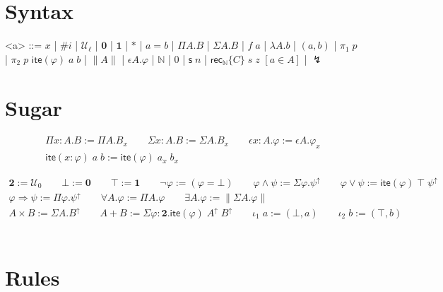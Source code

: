 \documentclass[acmsmall,screen,review]{acmart}
\newcommand{\mc}[1]{\ensuremath{\mathcal{#1}}}
\newcommand{\mb}[1]{\ensuremath{\mathbf{#1}}}
\newcommand{\ms}[1]{\ensuremath{\mathsf{#1}}}
\newcommand{\nats}{\mathbb{N}}
\newcommand{\dite}[3]{\ms{ite}(#1)\;#2\;#3}
\newcommand{\natrec}[3]{\ms{rec}_\nats\{#1\}\;#2\;#3}
\newcommand{\mhasty}[2]{[#1 \in #2]}
\newcommand{\invalidtm}[0]{\lightning}
\newcommand{\wkz}[1]{#1^\uparrow}
\newcommand{\clv}[2]{#1_{#2}}
\begin{document}
\section{Syntax}

\begin{grammar}
    <a> ::= \(x\) \;|\; \(\#i\) \;|\; \(\mc{U}_\ell\) \;|\; \(\mb{0}\) \;|\; \(\mb{1}\) \;|\; \(*\)
        \;|\; \(a = b\)
        \;|\; \(\Pi A . B\) \;|\; \(\Sigma A . B\) 
        \;|\; \(f\;a\) \;|\; \(\lambda A . b\)
        \;|\; \((a, b)\) \;|\; \(\pi_1\;p\) \;|\; \(\pi_2\;p\)
        \alt \(\dite{\varphi}{a}{b}\) \;|\; \(\|A\|\) \;|\; \(\epsilon A . \varphi\)
        \;|\; \(\nats\) \;|\; \(0\) \;|\; \(\ms{s}\;n\) \;|\; \(\natrec{C}{s}{z}\)
        \alt \(\mhasty{a}{A}\) \;|\; \(\invalidtm\)
\end{grammar}

\section{Sugar}

\begin{gather*}
    \Pi x : A . B := \Pi A . \clv{B}{x} \qquad
    \Sigma x : A . B := \Sigma A . \clv{B}{x} \qquad
    \epsilon x : A . \varphi := \epsilon A . \clv{\varphi}{x} \\
    \dite{x : \varphi}{a}{b} := \dite{\varphi}{\clv{a}{x}}{\clv{b}{x}}
\end{gather*}

\begin{gather*}
    \mb{2} := \mc{U}_0 \qquad
    \bot := \mb{0} \qquad
    \top := \mb{1} \qquad
    \lnot \varphi := (\varphi = \bot) \qquad
    \varphi \land \psi := \Sigma \varphi . \wkz{\psi} \qquad
    \varphi \lor \psi := \dite{\varphi}{\top}{\wkz{\psi}}
    \\
    \varphi \Rightarrow \psi := \Pi \varphi . \wkz{\psi} \qquad
    \forall A . \varphi := \Pi A . \varphi \qquad
    \exists A . \varphi := \|\Sigma A . \varphi\|
    \\ 
    A \times B := \Sigma A . \wkz{B} \qquad
    A + B := \Sigma \varphi : \mb{2} . \dite{\varphi}{\wkz{A}}{\wkz{B}} \qquad
    \iota_1\;a := (\bot, a) \qquad
    \iota_2\;b := (\top, b)
\end{gather*}

\begin{gather*}
\end{gather*}


\section{Rules}
\end{document}
